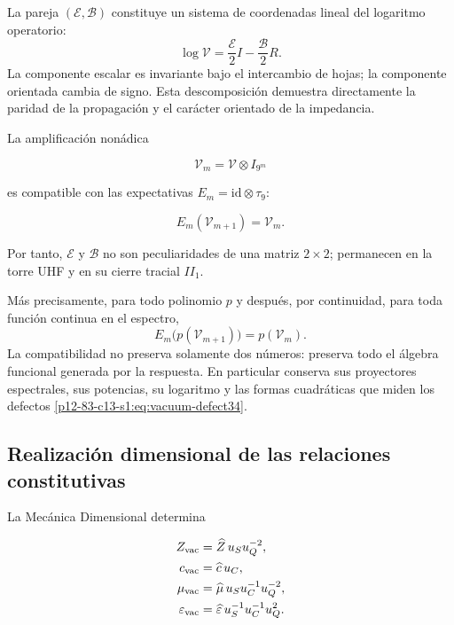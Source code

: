 La pareja \((\mathcal E,\mathcal B)\) constituye un sistema de coordenadas lineal del logaritmo
operatorio:
\begin{equation}
\log\mathcal V
=\frac{\mathcal E}{2}I-\frac{\mathcal B}{2}R.
\label{p12-83-c13-s1:eq:vacuum-log-decomposition}
\end{equation}
La componente escalar es invariante bajo el intercambio de hojas; la
componente orientada cambia de signo. Esta descomposici\'on demuestra
directamente la paridad de la propagaci\'on y el car\'acter orientado de la
impedancia.

La amplificaci\'on non\'adica

\[
\mathcal V_m=\mathcal V\otimes I_{9^m}
\]

es compatible con las expectativas \(E_m=\mathrm{id}\otimes\tau_9\):

\[
E_m(\mathcal V_{m+1})=\mathcal V_m.
\]

Por tanto, \(\mathcal E\) y \(\mathcal B\) no son peculiaridades de una matriz \(2\times2\); permanecen en la torre UHF y en su cierre tracial \(II_1\).

M\'as precisamente, para todo polinomio \(p\) y despu\'es, por continuidad,
para toda funci\'on continua en el espectro,
\begin{equation}
E_m\bigl(p(\mathcal V_{m+1})\bigr)=p(\mathcal V_m).
\label{p12-83-c13-s1:eq:vacuum-functional-refinement}
\end{equation}
La compatibilidad no preserva solamente dos n\'umeros: preserva todo el
\'algebra funcional generada por la respuesta. En particular conserva sus
proyectores espectrales, sus potencias, su logaritmo y las formas cuadr\'aticas
que miden los defectos \cref{p12-83-c13-s1:eq:vacuum-defect34}.

\subsection{Realizaci\'on dimensional de las relaciones constitutivas}

La Mec\'anica Dimensional determina

\begin{align}
Z_{\rm vac}&=\widehat Z\,u_Su_Q^{-2},\\
c_{\rm vac}&=\widehat c\,u_C,\\
\mu_{\rm vac}&=\widehat\mu\,u_Su_C^{-1}u_Q^{-2},\\
\varepsilon_{\rm vac}&=\widehat\varepsilon\,u_S^{-1}u_C^{-1}u_Q^2.
\label{p12-83-c13-s1:eq:vacuum-sections}
\end{align}

